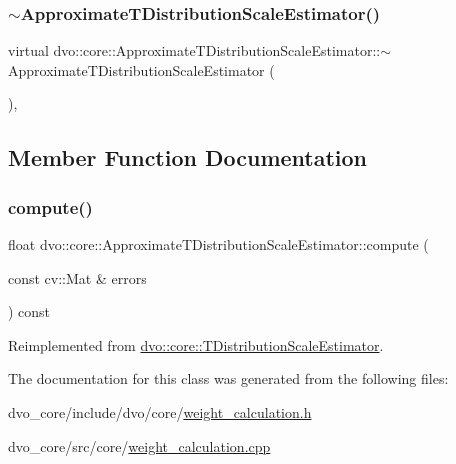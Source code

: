 \subsubsection{\texorpdfstring{$\sim$\+Approximate\+T\+Distribution\+Scale\+Estimator()}{~ApproximateTDistributionScaleEstimator()}}
{\footnotesize\ttfamily virtual dvo\+::core\+::\+Approximate\+T\+Distribution\+Scale\+Estimator\+::$\sim$\+Approximate\+T\+Distribution\+Scale\+Estimator (\begin{DoxyParamCaption}{ }\end{DoxyParamCaption})\hspace{0.3cm}{\ttfamily [inline]}, {\ttfamily [virtual]}}



\subsection{Member Function Documentation}
\mbox{\label{classdvo_1_1core_1_1_approximate_t_distribution_scale_estimator_aee2b37700df1eb0125b8e0d352f7ceab}} 
\subsubsection{\texorpdfstring{compute()}{compute()}}
{\footnotesize\ttfamily float dvo\+::core\+::\+Approximate\+T\+Distribution\+Scale\+Estimator\+::compute (\begin{DoxyParamCaption}\item[{const cv\+::\+Mat \&}]{errors }\end{DoxyParamCaption}) const\hspace{0.3cm}{\ttfamily [virtual]}}



Reimplemented from \mbox{\hyperlink{classdvo_1_1core_1_1_t_distribution_scale_estimator_a0ed88ffeb9b71110e3ae69b681526bc4}{dvo\+::core\+::\+T\+Distribution\+Scale\+Estimator}}.



The documentation for this class was generated from the following files\+:\begin{DoxyCompactItemize}
\item 
dvo\+\_\+core/include/dvo/core/\mbox{\hyperlink{weight__calculation_8h}{weight\+\_\+calculation.\+h}}\item 
dvo\+\_\+core/src/core/\mbox{\hyperlink{weight__calculation_8cpp}{weight\+\_\+calculation.\+cpp}}\end{DoxyCompactItemize}

